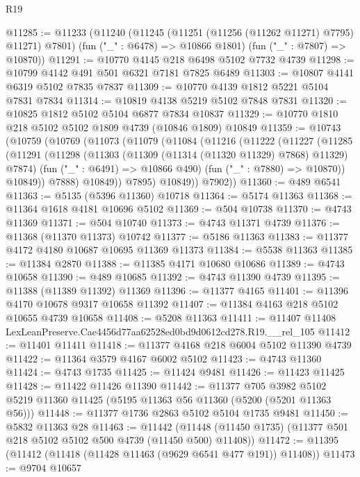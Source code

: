 \begin{lexlean}{R19}
\begin{coremodule}
{{{{{{{{{{{@11285 := @11233
    (@11240
      (@11245 (@11251 (@11256 (@11262 @11271) @7795) @11271) @7801)
      (fun ("_" : @6478) => @10866 @1801)
      (fun ("_" : @7807) => @10870))
@11291 := @10770 @4145 @218 @6498 @5102 @7732 @4739
@11298 := @10799 @4142 @491 @501 @6321 @7181 @7825 @6489
@11303 := @10807 @4141 @6319 @5102 @7835 @7837
@11309 := @10770 @4139 @1812 @5221 @5104 @7831 @7834
@11314 := @10819 @4138 @5219 @5102 @7848 @7831
@11320 := @10825 @1812 @5102 @5104 @6877 @7834 @10837
@11329 := @10770 @1810 @218 @5102 @5102 @1809 @4739 (@10846 @1809) @10849
@11359 := @10743
    (@10759
      (@10769
        (@11073
          (@11079
            (@11084
              (@11216
                (@11222
                  (@11227
                    (@11285
                      (@11291
                        (@11298
                          (@11303 (@11309 (@11314 (@11320 @11329) @7868) @11329) @7874)
                          (fun ("_" : @6491) => @10866 @490)
                          (fun ("_" : @7880) => @10870))
                        @10849))
                    @7888)
                  @10849))
              @7895)
            @10849))
        @7902))
@11360 := @489 @6541
@11363 := @5135 (@5396 @11360) @10718
@11364 := @5174 @11363
@11368 := @11364 @1618 @4181 @10696 @5102
@11369 := @504 @10738
@11370 := @4743 @11369
@11371 := @504 @10740
@11373 := @4743 @11371 @4739
@11376 := @11368 (@11370 @11373) @10742
@11377 := @5186 @11363
@11383 := @11377 @4172 @4180 @10687 @10695 @11369 @11373
@11384 := @5538 @11363
@11385 := @11384 @2870
@11388 := @11385 @4171 @10680 @10686
@11389 := @4743 @10658
@11390 := @489 @10685
@11392 := @4743 @11390 @4739
@11395 := @11388 (@11389 @11392) @11369
@11396 := @11377 @4165
@11401 := @11396 @4170 @10678 @9317 @10658 @11392
@11407 := @11384 @4163 @218 @5102 @10655 @4739 @10658
@11408 := @5208 @11363
@11411 := @11407 @11408 LexLeanPreserve.Cae4456d77aa62528ed0bd9d0612cd278.R19.__rel_105
@11412 := @11401 @11411
@11418 := @11377 @4168 @218 @6004 @5102 @11390 @4739
@11422 := @11364 @3579 @4167 @6002 @5102
@11423 := @4743 @11360
@11424 := @4743 @1735
@11425 := @11424 @9481
@11426 := @11423 @11425
@11428 := @11422 @11426 @11390
@11442 := @11377
    @705
    @3982
    @5102
    @5219
    @11360
    @11425
    (@5195 @11363 @56 @11360 (@5200 (@5201 @11363 @56)))
@11448 := @11377 @1736 @2863 @5102 @5104 @1735 @9481
@11450 := @5832 @11363 @28
@11463 := @11442
    (@11448 (@11450 @1735) (@11377 @501 @218 @5102 @5102 @500 @4739 (@11450 @500) @11408))
@11472 := @11395 (@11412 (@11418 (@11428 @11463 (@9629 @6541 @477 @191)) @11408))
@11473 := @9704 @10657
}}}}}}}}}}}
\end{coremodule}
\end{lexlean}
